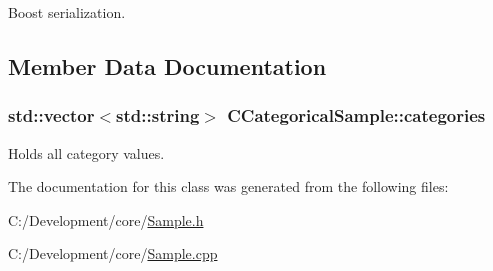 Boost serialization. 



\subsection{Member Data Documentation}
\hypertarget{class_c_categorical_sample_ae713b59c14aba1434e1754d837a4eeb0}{
\subsubsection[{categories}]{\setlength{\rightskip}{0pt plus 5cm}std\-::vector$<$std\-::string$>$ C\-Categorical\-Sample\-::categories\hspace{0.3cm}{\ttfamily [private]}}}\label{class_c_categorical_sample_ae713b59c14aba1434e1754d837a4eeb0}
Holds all category values. 

The documentation for this class was generated from the following files\-:\begin{DoxyCompactItemize}
\item 
C\-:/\-Development/core/\hyperlink{_sample_8h}{Sample.\-h}\item 
C\-:/\-Development/core/\hyperlink{_sample_8cpp}{Sample.\-cpp}\end{DoxyCompactItemize}
